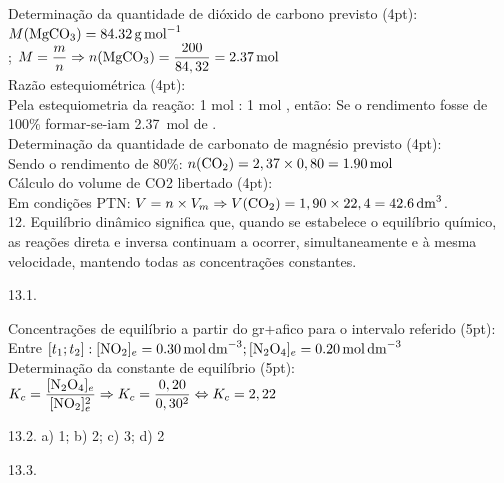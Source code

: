 \documentclass{article}
\begin{document}
				Determinação da quantidade de dióxido de carbono previsto (4pt):\\
				$M(\ce{MgCO3}) = \SI{84,32}{\gram\per\mole}$\\; 
				$M=\dfrac{m}{n} \Rightarrow n(\ce{MgCO3})=\dfrac{200}{84,32} = \SI{2,37}{\mole}$\\[8pt]
				Razão estequiométrica (4pt):\\
				Pela estequiometria da reação: 1 mol  : 1 mol , então:
				Se o rendimento fosse de 100\% formar-se-iam \SI{2,37}{\mole}  de .\\[8pt]
				Determinação da quantidade de carbonato de magnésio previsto (4pt):\\
				Sendo o rendimento de 80\%: $n(\ce{CO2}) = 2,37 \times 0,80 = \SI{1,90}{\mole}$ \\[8pt]
				Cálculo do volume de CO2 libertado (4pt):\\
				Em condições PTN:  $V = n \times V_m \Rightarrow V(\ce{CO2}) = 1,90 \times 22,4 = \SI{42,6}{\cubic\deci\meter}$.\\

12.	Equilíbrio dinâmico significa que, quando se estabelece o equilíbrio químico, as reações direta e inversa continuam a ocorrer, simultaneamente e à mesma velocidade, mantendo todas as concentrações constantes.

		
13.1. 

					Concentrações de equilíbrio a partir do gr+afico para o intervalo referido (5pt):\\
					Entre $[t_1; t_2]: [\ce{NO2}]_e = \SI{0,30}{\mole\per\cubic\deci\meter}; [\ce{N2O4}]_e = \SI{0,20}{\mole\per\cubic\deci\meter}$ \\[8pt]
					Determinação da constante de equilíbrio (5pt):\\
					$K_c = \dfrac{[\ce{N2O4}]_e}{[\ce{NO2}]_e^2} \Rightarrow K_c = \dfrac{0,20}{0,30^2} \Leftrightarrow K_c = 2,22$

13.2. a) 1; b) 2; c) 3; d) 2

13.3. 
\end{document}
